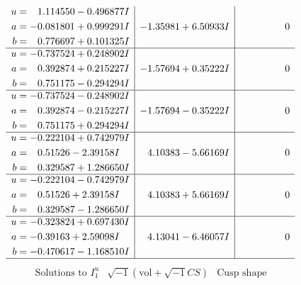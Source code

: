 \documentclass[1p]{elsarticle_modified}
\theoremstyle{definition}
\newcommand{\I}{\sqrt{-1}}
\begin{document}
$$\begin{array}{c|c|c}
\begin{aligned}
u &= \phantom{-}1.114550 - 0.496877 I \\
a &= -0.081801 + 0.999291 I \\
b &= \phantom{-}0.776697 + 0.101325 I\end{aligned}
 & -1.35981 + 6.50933 I & \phantom{-0.000000 } 0 \\ \hline\begin{aligned}
u &= -0.737524 + 0.248902 I \\
a &= \phantom{-}0.392874 + 0.215227 I \\
b &= \phantom{-}0.751175 - 0.294294 I\end{aligned}
 & -1.57694 + 0.35222 I & \phantom{-0.000000 } 0 \\ \hline\begin{aligned}
u &= -0.737524 - 0.248902 I \\
a &= \phantom{-}0.392874 - 0.215227 I \\
b &= \phantom{-}0.751175 + 0.294294 I\end{aligned}
 & -1.57694 - 0.35222 I & \phantom{-0.000000 } 0 \\ \hline\begin{aligned}
u &= -0.222104 + 0.742979 I \\
a &= \phantom{-}0.51526 - 2.39158 I \\
b &= \phantom{-}0.329587 + 1.286650 I\end{aligned}
 & \phantom{-}4.10383 - 5.66169 I & \phantom{-0.000000 } 0 \\ \hline\begin{aligned}
u &= -0.222104 - 0.742979 I \\
a &= \phantom{-}0.51526 + 2.39158 I \\
b &= \phantom{-}0.329587 - 1.286650 I\end{aligned}
 & \phantom{-}4.10383 + 5.66169 I & \phantom{-0.000000 } 0 \\ \hline\begin{aligned}
u &= -0.323824 + 0.697430 I \\
a &= -0.39163 + 2.59098 I \\
b &= -0.470617 - 1.168510 I\end{aligned}
 & \phantom{-}4.13041 - 6.46057 I & \phantom{-0.000000 } 0\\
 \hline 
 \end{array}$$\newpage$$\begin{array}{c|c|c}  
\text{Solutions to }I^u_{1}& \I (\text{vol} + \sqrt{-1}CS) & \text{Cusp shape}\\
 \hline 
\begin{aligned}

\end{aligned}
\end{array}$$
\end{document}
